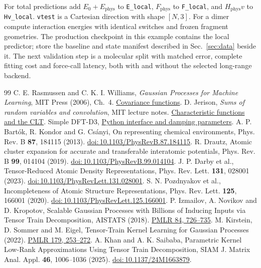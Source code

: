 \documentclass[11pt,a4paper]{article}
\newcommand{\phys}{\mathrm{phys}}\newcommand{\refm}{\mathrm{ref}}
\newcommand{\doi}[1]{\href{https://doi.org/#1}{doi:\,#1}}\newcommand{\pg}{\clearpage}
\begin{document}
For total predictions add $E_0+E_{\phys}$ to \texttt{E\_local}, $F_{\phys}$ to \texttt{F\_local}, and $H_{\phys}v$ to \texttt{Hv\_local}. \texttt{vtest} is a Cartesian direction with shape $[N,3]$. For a dimer compute interaction energies with identical switches and frozen fragment geometries. The production checkpoint in this example contains the local predictor; store the baseline and state manifest described in Sec.~\ref{sec:data} beside it. The next validation step is a molecular split with matched error, complete fitting cost and force-call latency, both with and without the selected long-range backend.
\pg
\begingroup\fontsize{8.5pt}{9.6pt}\selectfont\setlength{\parskip}{0pt}
\begin{thebibliography}{99}\setlength{\itemsep}{0pt}\setlength{\parsep}{0pt}
 C. E. Rasmussen and C. K. I. Williams, \emph{Gaussian Processes for Machine Learning}, MIT Press (2006), Ch.~4. \href{https://gaussianprocess.org/gpml/chapters/RW4.pdf}{Covariance functions}.
 D. Jerison, \emph{Sums of random variables and convolution}, MIT lecture notes. \href{https://math.mit.edu/~jerison/103/handouts/fourierint2.13.pdf}{Characteristic functions and the CLT}.
 Simple DFT-D3, \href{https://dftd3.readthedocs.io/en/latest/api/python.html}{Python interface and damping parameters}.
 A. P. Bart\'ok, R. Kondor and G. Cs\'anyi, On representing chemical environments, Phys. Rev. B \textbf{87}, 184115 (2013). \doi{10.1103/PhysRevB.87.184115}.
 R. Drautz, Atomic cluster expansion for accurate and transferable interatomic potentials, Phys. Rev. B \textbf{99}, 014104 (2019). \doi{10.1103/PhysRevB.99.014104}.
 J. P. Darby et al., Tensor-Reduced Atomic Density Representations, Phys. Rev. Lett. \textbf{131}, 028001 (2023). \doi{10.1103/PhysRevLett.131.028001}.
 S. N. Pozdnyakov et al., Incompleteness of Atomic Structure Representations, Phys. Rev. Lett. \textbf{125}, 166001 (2020). \doi{10.1103/PhysRevLett.125.166001}.
 P. Izmailov, A. Novikov and D. Kropotov, Scalable Gaussian Processes with Billions of Inducing Inputs via Tensor Train Decomposition, AISTATS (2018). \href{https://proceedings.mlr.press/v84/izmailov18a.html}{PMLR 84, 726--735}.
 M. Kirstein, D. Sommer and M. Eigel, Tensor-Train Kernel Learning for Gaussian Processes (2022). \href{https://proceedings.mlr.press/v179/kirstein22a.html}{PMLR 179, 253--272}.
 A. Khan and A. K. Saibaba, Parametric Kernel Low-Rank Approximations Using Tensor Train Decomposition, SIAM J. Matrix Anal. Appl. \textbf{46}, 1006--1036 (2025). \doi{10.1137/24M1663879}.

\end{thebibliography}
\end{document}
